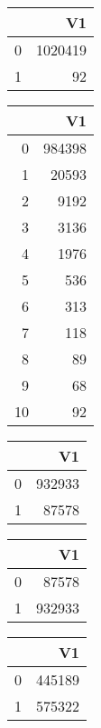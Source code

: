 \bigskip\bigskip
\centering
\begin{tabular}{rr}
  \hline
 & V1 \\ 
  \hline
0 & 1020419 \\ 
  1 &  92 \\ 
   \hline
\end{tabular}

\bigskip\bigskip
\centering
\begin{tabular}{rr}
  \hline
 & V1 \\ 
  \hline
0 & 984398 \\ 
  1 & 20593 \\ 
  2 & 9192 \\ 
  3 & 3136 \\ 
  4 & 1976 \\ 
  5 & 536 \\ 
  6 & 313 \\ 
  7 & 118 \\ 
  8 &  89 \\ 
  9 &  68 \\ 
  10 &  92 \\ 
   \hline
\end{tabular}

\bigskip\bigskip
\centering
\begin{tabular}{rr}
  \hline
 & V1 \\ 
  \hline
0 & 932933 \\ 
  1 & 87578 \\ 
   \hline
\end{tabular}

\bigskip\bigskip
\centering
\begin{tabular}{rr}
  \hline
 & V1 \\ 
  \hline
0 & 87578 \\ 
  1 & 932933 \\ 
   \hline
\end{tabular}

\bigskip\bigskip
\centering
\begin{tabular}{rr}
  \hline
 & V1 \\ 
  \hline
0 & 445189 \\ 
  1 & 575322 \\ 
   \hline
\end{tabular}

